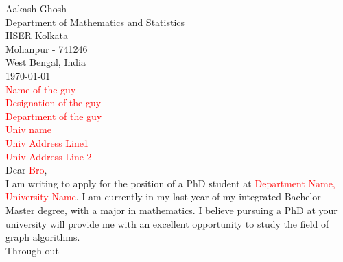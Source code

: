 \documentclass[a4paper, 10pt]{article}
\begin{document}
Aakash Ghosh\\
Department of Mathematics and Statistics\\
IISER Kolkata\\
Mohanpur - 741246\\
West Bengal, India\\
\newline
\today\\
\newline
\textcolor{red}{Name of the guy\\
Designation of the guy\\
Department of the guy\\
Univ name\\
Univ Address Line1\\
Univ Address Line 2\\}
\newline
Dear \textcolor{red}{Bro},\\
I am writing to apply for the position of a PhD student at \textcolor{red}{Department Name, University Name}. I am currently in my last year of my integrated Bachelor-Master degree, with a major in mathematics. I believe pursuing a PhD at your university will provide me with an excellent opportunity to study the field of graph algorithms. \\
\newline
Through out 
\end{document}
